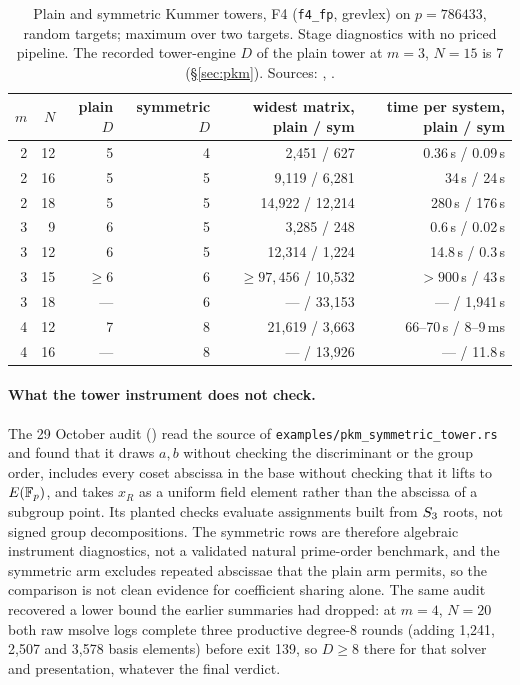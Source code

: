 \begin{table}[t]
\centering\small
\begin{tabular}{@{}rrrrrr@{}}
\toprule
$m$ & $N$ & plain $D$ & symmetric $D$ & widest matrix, plain / sym & time per system, plain / sym \\
\midrule
2 & 12 & 5 & 4 & 2{,}451 / 627 & 0.36\,s / 0.09\,s \\
2 & 16 & 5 & 5 & 9{,}119 / 6{,}281 & 34\,s / 24\,s \\
2 & 18 & 5 & 5 & 14{,}922 / 12{,}214 & 280\,s / 176\,s \\
3 & 9 & 6 & 5 & 3{,}285 / 248 & 0.6\,s / 0.02\,s \\
3 & 12 & 6 & 5 & 12{,}314 / 1{,}224 & 14.8\,s / 0.3\,s \\
3 & 15 & $\ge6$ & 6 & $\ge97{,}456$ / 10{,}532 & $>900$\,s / 43\,s \\
3 & 18 & --- & 6 & --- / 33{,}153 & --- / 1{,}941\,s \\
4 & 12 & 7 & 8 & 21{,}619 / 3{,}663 & 66--70\,s / 8--9\,ms \\
4 & 16 & --- & 8 & --- / 13{,}926 & --- / 11.8\,s \\
\bottomrule
\end{tabular}
\caption[]{Plain and symmetric Kummer towers, F4 (\texttt{f4\_fp}, grevlex)
on $p=786433$, random targets; maximum over two targets. Stage diagnostics
with no priced pipeline. The recorded tower-engine $D$ of the plain tower at
$m=3$, $N=15$ is 7 (\S\ref{sec:pkm}). Sources:
,
.}
\label{tab:pa-sym}
\end{table}

\paragraph{What the tower instrument does not check.} The 29 October audit
() read the source of
\texttt{examples/pkm\_symmetric\_tower.rs} and found that it draws $a,b$
without checking the discriminant or the group order, includes every coset
abscissa in the base without checking that it lifts to $E(\mathbb{F}_p)$, and
takes $x_R$ as a uniform field element rather than the abscissa of a
subgroup point. Its planted checks evaluate assignments built from $S_{3}$
roots, not signed group decompositions. The symmetric rows are therefore
algebraic instrument diagnostics, not a validated natural prime-order
benchmark, and the symmetric arm excludes repeated abscissae that the plain
arm permits, so the comparison is not clean evidence for coefficient
sharing alone. The same audit recovered a lower bound the earlier
summaries had dropped: at $m=4$, $N=20$ both raw msolve logs complete three
productive degree-8 rounds (adding 1{,}241, 2{,}507 and 3{,}578 basis
elements) before exit 139, so $D\ge8$ there for that solver and
presentation, whatever the final verdict.


